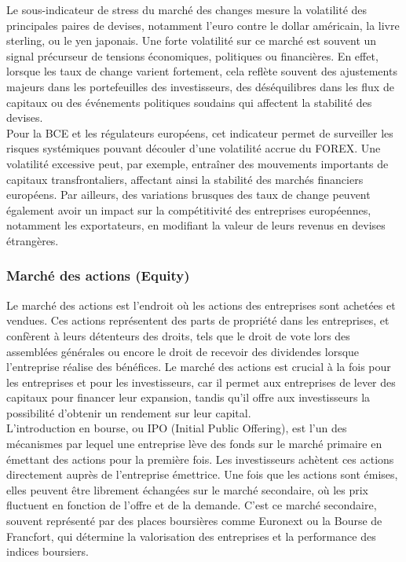 \begin{sloppypar}
Le sous-indicateur de stress du marché des changes mesure la volatilité des principales paires de devises, notamment l'euro contre le dollar américain, la livre sterling, ou le yen japonais. Une forte volatilité sur ce marché est souvent un signal précurseur de tensions économiques, politiques ou financières. En effet, lorsque les taux de change varient fortement, cela reflète souvent des ajustements majeurs dans les portefeuilles des investisseurs, des déséquilibres dans les flux de capitaux ou des événements politiques soudains qui affectent la stabilité des devises.\\

Pour la BCE et les régulateurs européens, cet indicateur permet de surveiller les risques systémiques pouvant découler d'une volatilité accrue du FOREX. Une volatilité excessive peut, par exemple, entraîner des mouvements importants de capitaux transfrontaliers, affectant ainsi la stabilité des marchés financiers européens. Par ailleurs, des variations brusques des taux de change peuvent également avoir un impact sur la compétitivité des entreprises européennes, notamment les exportateurs, en modifiant la valeur de leurs revenus en devises étrangères.

\subsubsection{Marché des actions (Equity)}

Le marché des actions est l'endroit où les actions des entreprises sont achetées et vendues. Ces actions représentent des parts de propriété dans les entreprises, et confèrent à leurs détenteurs des droits, tels que le droit de vote lors des assemblées générales ou encore le droit de recevoir des dividendes lorsque l'entreprise réalise des bénéfices. Le marché des actions est crucial à la fois pour les entreprises et pour les investisseurs, car il permet aux entreprises de lever des capitaux pour financer leur expansion, tandis qu’il offre aux investisseurs la possibilité d'obtenir un rendement sur leur capital.\\

L’introduction en bourse, ou IPO (Initial Public Offering), est l’un des mécanismes par lequel une entreprise lève des fonds sur le marché primaire en émettant des actions pour la première fois. Les investisseurs achètent ces actions directement auprès de l'entreprise émettrice. Une fois que les actions sont émises, elles peuvent être librement échangées sur le marché secondaire, où les prix fluctuent en fonction de l'offre et de la demande. C'est ce marché secondaire, souvent représenté par des places boursières comme Euronext ou la Bourse de Francfort, qui détermine la valorisation des entreprises et la performance des indices boursiers.\\


\end{sloppypar}
